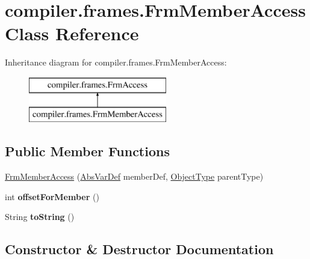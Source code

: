 \hypertarget{classcompiler_1_1frames_1_1_frm_member_access}{}\section{compiler.\+frames.\+Frm\+Member\+Access Class Reference}
\label{classcompiler_1_1frames_1_1_frm_member_access}
Inheritance diagram for compiler.\+frames.\+Frm\+Member\+Access\+:\begin{figure}[H]
\begin{center}
\leavevmode
\includegraphics[height=2.000000cm]{classcompiler_1_1frames_1_1_frm_member_access}
\end{center}
\end{figure}
\subsection*{Public Member Functions}
\begin{DoxyCompactItemize}
\item 
\hyperlink{classcompiler_1_1frames_1_1_frm_member_access_a9503fce754e17b25ee90c1cd3a651aa7}{Frm\+Member\+Access} (\hyperlink{classcompiler_1_1abstr_1_1tree_1_1def_1_1_abs_var_def}{Abs\+Var\+Def} member\+Def, \hyperlink{classcompiler_1_1seman_1_1type_1_1_object_type}{Object\+Type} parent\+Type)
\item 
\mbox{\label{classcompiler_1_1frames_1_1_frm_member_access_a41905e0621a17a5dc604bb96b34ac11d}} 
int {\bfseries offset\+For\+Member} ()
\item 
\mbox{\label{classcompiler_1_1frames_1_1_frm_member_access_a936c20fa90c57349b9d7fb85c12cf21d}} 
String {\bfseries to\+String} ()
\end{DoxyCompactItemize}


\subsection{Constructor \& Destructor Documentation}
\mbox{\label{classcompiler_1_1frames_1_1_frm_member_access_a9503fce754e17b25ee90c1cd3a651aa7}} 
